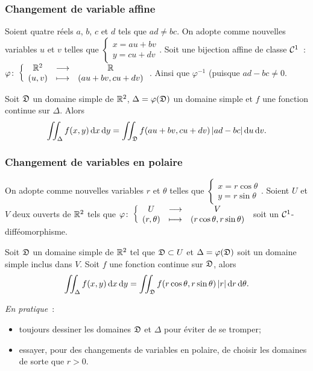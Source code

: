 \subsubsection{Changement de variable affine}

\begin{theo}
  Soient quatre réels \(a\), \(b\), \(c\) et \(d\) tels que \(ad \neq bc\). On adopte comme nouvelles variables \(u\) et \(v\) telles que \(\begin{cases} x=au+bv \\ y=cu+dv \end{cases}\). Soit une bijection affine de classe \(\mathcal{C}^{1}\)~: \(\varphi\colon \left\{\begin{array}{ccc} \mathbb{R}^2 & \longrightarrow &\mathbb{R}\\ (u,v) & \longmapsto & (au+bv, cu+dv) \end{array} \right.\). Ainsi que \(\varphi^{-1}\) (puisque \(ad-bc\neq 0\).

Soit \(\mathfrak{D}\) un domaine simple de \(\mathbb{R}^2\), \(\Delta=\varphi(\mathfrak{D})\) un domaine simple et \(f\) une fonction continue sur \(\Delta\). Alors
\begin{equation}
  \iint_\Delta f(x,y)\mathop{}\mathopen{}\mathrm{d} x \mathop{}\mathopen{}\mathrm{d} y = \iint_{\mathfrak{D}} f(au+bv, cu+dv) \left\lvert ad-bc\right\rvert\mathop{}\mathopen{}\mathrm{d} u \mathop{}\mathopen{}\mathrm{d} v.
\end{equation}
\end{theo}

\subsubsection{Changement de variables en polaire}

\begin{theo}
  On adopte comme nouvelles variables \(r\) et \(\theta\) telles que \(\begin{cases} x=r\cos\theta \\ y=r\sin\theta \end{cases}\). Soient \(U\) et \(V\) deux ouverts de \(\mathbb{R}^2\) tels que \(\varphi\colon \left\{\begin{array}{ccc} U & \longrightarrow &V\\ (r, \theta) & \longmapsto & (r\cos\theta, r\sin\theta) \end{array} \right.\) soit un \(\mathcal{C}^{1}\)-difféomorphisme.

Soit \(\mathfrak{D}\) un domaine simple de \(\mathbb{R}^2\) tel que \(\mathfrak{D} \subset U\) et \(\Delta=\varphi(\mathfrak{D})\) soit un domaine simple inclus dans \(V\). Soit \(f\) une fonction continue sur \(\mathfrak{D}\), alors
\begin{equation}
   \iint_\Delta f(x,y)\mathop{}\mathopen{}\mathrm{d} x \mathop{}\mathopen{}\mathrm{d} y = \iint_{\mathfrak{D}} f(r\cos\theta, r\sin\theta) \left\lvert r\right\rvert\mathop{}\mathopen{}\mathrm{d} r \mathop{}\mathopen{}\mathrm{d} \theta.
\end{equation}
\end{theo}

\emph{En pratique}~:
\begin{itemize}
\item toujours dessiner les domaines \(\mathfrak{D}\) et \(\Delta\) pour éviter de se tromper;
\item essayer, pour des changements de variables en polaire, de choisir les domaines de sorte que \(r>0\).
\end{itemize}

